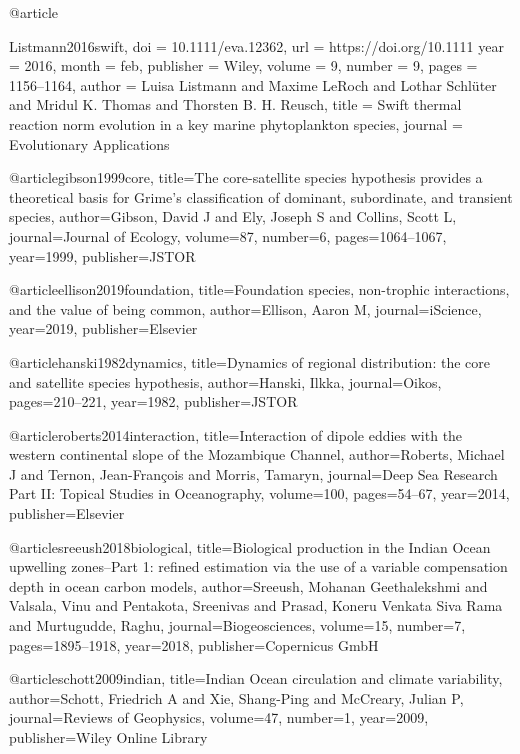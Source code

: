 @article{Listmann2016swift,
	doi = {10.1111/eva.12362},
	url = {https://doi.org/10.1111%
	year = 2016,
	month = {feb},
	publisher = {Wiley},
	volume = {9},
	number = {9},
	pages = {1156--1164},
	author = {Luisa Listmann and Maxime LeRoch and Lothar Schlüter and Mridul K. Thomas and Thorsten B. H. Reusch},
	title = {Swift thermal reaction norm evolution in a key marine phytoplankton species},
	journal = {Evolutionary Applications}
}

@article{gibson1999core,
  title={The core-satellite species hypothesis provides a theoretical basis for Grime's classification of dominant, subordinate, and transient species},
  author={Gibson, David J and Ely, Joseph S and Collins, Scott L},
  journal={Journal of Ecology},
  volume={87},
  number={6},
  pages={1064--1067},
  year={1999},
  publisher={JSTOR}
}

@article{ellison2019foundation,
  title={Foundation species, non-trophic interactions, and the value of being common},
  author={Ellison, Aaron M},
  journal={iScience},
  year={2019},
  publisher={Elsevier}
}

@article{hanski1982dynamics,
  title={Dynamics of regional distribution: the core and satellite species hypothesis},
  author={Hanski, Ilkka},
  journal={Oikos},
  pages={210--221},
  year={1982},
  publisher={JSTOR}
}



@article{roberts2014interaction,
  title={Interaction of dipole eddies with the western continental slope of the Mozambique Channel},
  author={Roberts, Michael J and Ternon, Jean-Fran{\c{c}}ois and Morris, Tamaryn},
  journal={Deep Sea Research Part II: Topical Studies in Oceanography},
  volume={100},
  pages={54--67},
  year={2014},
  publisher={Elsevier}
}


@article{sreeush2018biological,
  title={Biological production in the Indian Ocean upwelling zones--Part 1: refined estimation via the use of a variable compensation depth in ocean carbon models},
  author={Sreeush, Mohanan Geethalekshmi and Valsala, Vinu and Pentakota, Sreenivas and Prasad, Koneru Venkata Siva Rama and Murtugudde, Raghu},
  journal={Biogeosciences},
  volume={15},
  number={7},
  pages={1895--1918},
  year={2018},
  publisher={Copernicus GmbH}
}


@article{schott2009indian,
  title={Indian Ocean circulation and climate variability},
  author={Schott, Friedrich A and Xie, Shang-Ping and McCreary, Julian P},
  journal={Reviews of Geophysics},
  volume={47},
  number={1},
  year={2009},
  publisher={Wiley Online Library}
}

}

